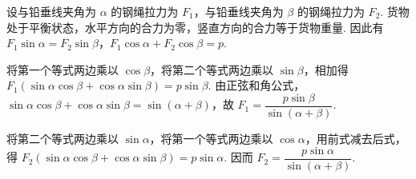\begin{solution}
设与铅垂线夹角为 \(\alpha\) 的钢绳拉力为 \(F_1\)，与铅垂线夹角为 \(\beta\) 的钢绳拉力为 \(F_2\). 货物处于平衡状态，水平方向的合力为零，竖直方向的合力等于货物重量. 因此有
\(F_1\sin\alpha=F_2\sin\beta\)，\(F_1\cos\alpha+F_2\cos\beta=p\).

将第一个等式两边乘以 \(\cos\beta\)，将第二个等式两边乘以 \(\sin\beta\)，相加得 \(F_1\left(\sin\alpha\cos\beta+\cos\alpha\sin\beta\right)=p\sin\beta\). 由正弦和角公式，\(\sin\alpha\cos\beta+\cos\alpha\sin\beta=\sin\left(\alpha+\beta\right)\)，故 \(F_1=\dfrac{p\sin\beta}{\sin\left(\alpha+\beta\right)}\).

将第二个等式两边乘以 \(\sin\alpha\)，将第一个等式两边乘以 \(\cos\alpha\)，用前式减去后式，得 \(F_2\left(\sin\alpha\cos\beta+\cos\alpha\sin\beta\right)=p\sin\alpha\). 因而 \(F_2=\dfrac{p\sin\alpha}{\sin\left(\alpha+\beta\right)}\).
\end{solution}
